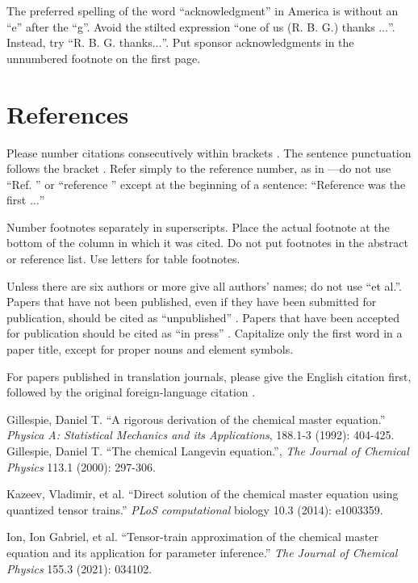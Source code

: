 \documentclass[conference]{IEEEtran}
\begin{document}
{The preferred spelling of the word ``acknowledgment'' in America is without 
an ``e'' after the ``g''. Avoid the stilted expression ``one of us (R. B. 
G.) thanks $\ldots$''. Instead, try ``R. B. G. thanks$\ldots$''. Put sponsor 
acknowledgments in the unnumbered footnote on the first page.

\section*{References}

Please number citations consecutively within brackets \cite{b1}. The 
sentence punctuation follows the bracket \cite{b2}. Refer simply to the reference 
number, as in \cite{b3}---do not use ``Ref. \cite{b3}'' or ``reference \cite{b3}'' except at 
the beginning of a sentence: ``Reference \cite{b3} was the first $\ldots$''

Number footnotes separately in superscripts. Place the actual footnote at 
the bottom of the column in which it was cited. Do not put footnotes in the 
abstract or reference list. Use letters for table footnotes.

Unless there are six authors or more give all authors' names; do not use 
``et al.''. Papers that have not been published, even if they have been 
submitted for publication, should be cited as ``unpublished'' \cite{b4}. Papers 
that have been accepted for publication should be cited as ``in press'' \cite{b5}. 
Capitalize only the first word in a paper title, except for proper nouns and 
element symbols.

For papers published in translation journals, please give the English 
citation first, followed by the original foreign-language citation \cite{b6}.

\begin{thebibliography}{100} %
 Gillespie, Daniel T. ``A rigorous derivation of the chemical master equation.'' {\it Physica A: Statistical Mechanics and its Applications}, 188.1-3 (1992): 404-425.
 Gillespie, Daniel T. ``The chemical Langevin equation.'', {\it The Journal of Chemical Physics} 113.1 (2000): 297-306.

 Kazeev, Vladimir, et al. ``Direct solution of the chemical master equation using quantized tensor trains.'' {\it PLoS computational} biology 10.3 (2014): e1003359.

 Ion, Ion Gabriel, et al. ``Tensor-train approximation of the chemical master equation and its application for parameter inference.'' {\it The Journal of Chemical Physics} 155.3 (2021): 034102.


\end{thebibliography}}
\end{document}
